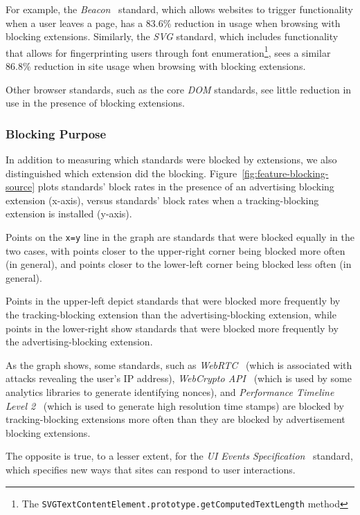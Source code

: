 For example, the \textit{Beacon}~\cite{beaconapi} standard, which allows websites
to trigger functionality when a user leaves a page, has a 83.6\% reduction
in usage when browsing with blocking extensions.  Similarly, the
\emph{SVG} standard, which includes functionality that allows for fingerprinting
users through font enumeration\footnote{The \texttt{SVGTextContentElement.prototype.getComputedTextLength}
method}, sees a similar 86.8\% reduction in site usage when browsing with
blocking extensions.

Other browser standards, such as the core \textit{DOM} standards,
see little reduction in use in the presence of blocking extensions.

\subsubsection{Blocking Purpose}



In addition to measuring which standards were blocked by extensions, we also
distinguished which extension did the blocking.
Figure~\ref{fig:feature-blocking-source} plots standards' block rates
in the presence of an advertising blocking extension (x-axis), versus standards'
block rates when a tracking-blocking extension is installed (y-axis).

Points on the \texttt{x=y} line in the graph are standards that were blocked
equally in the two cases, with points closer to the
upper-right corner being blocked more often (in general), and points closer to the
lower-left corner being blocked less often (in general).

Points in the upper-left depict standards that were blocked more frequently by
the tracking-blocking extension than the advertising-blocking extension, while
points in the lower-right show standards that were blocked more frequently by
the advertising-blocking extension.

As the graph shows, some standards, such as \emph{WebRTC}~\cite{webrtcw3c}
(which is associated with attacks revealing the user's IP address),
\emph{WebCrypto API}~\cite{webcryptow3c} (which is used by some analytics libraries
to generate identifying nonces), and
\emph{Performance Timeline Level 2}~\cite{perftimingw3c} (which is used to generate
high resolution time stamps) are blocked by tracking-blocking extensions
more often than they are blocked by advertisement blocking extensions.

The opposite is true, to a lesser extent, for the \emph{UI Events
Specification}~\cite{uievents3c} standard, which specifies new ways that
sites can respond to user interactions.

